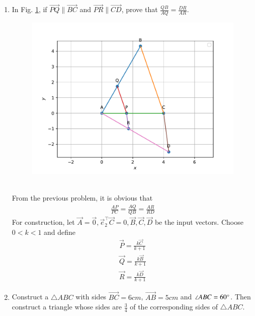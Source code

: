 \documentclass[journal,12pt,twocolumn]{IEEEtran}
\renewcommand\thesection{\arabic{section}}
\begin{document}
\begin{enumerate}[label=\thesection.\arabic*.,ref=\thesection.\theenumi]
    \item In 
    Fig. 
	  \ref{fig:matrix-10-11.pdf},
if $\vec{PQ} \parallel \vec{BC}$ and $\vec{PR} \parallel \vec{CD}$, prove that $\frac{QB}{AQ} = \frac{DR}{AR}$.
  \begin{figure}
	  \centering 
	  \includegraphics[width=\columnwidth]{figs/matrix-10-11.pdf}
	  \caption{}
	  \label{fig:matrix-10-11.pdf}
	  \end{figure}
	  \\
%	
\solution
From the previous problem, it is obvious that 
\begin{align}
	\frac{AP}{PC}= 
	\frac{AQ}{QB}= 
	\frac{AR}{RD}
\end{align}
For construction, let $\vec{A} = \vec{0}, \vec{e}_2^{\top}\vec{C} = 0, \vec{B}, \vec{C}, \vec{D} $ be the input vectors.  Choose $0 < k < 1$ and define
\begin{align}
	\vec{P} = \frac{
	k\vec{C}
	}{k+1}
	\\
	\vec{Q} = \frac{
	k\vec{B}
	}{k+1}
	\\
	\vec{R} = \frac{
	k\vec{D}
	}{k+1}
\end{align}
    \item Construct a $\triangle ABC$ with sides $\vec{BC}=6cm$, $\vec{AB} = 5cm$ and $\angle{ABC} = 60\degree$. Then construct a triangle whose sides are $\frac{3}{4}$ of the corresponding sides of $\triangle ABC$.\\

\end{enumerate}
\end{document}
